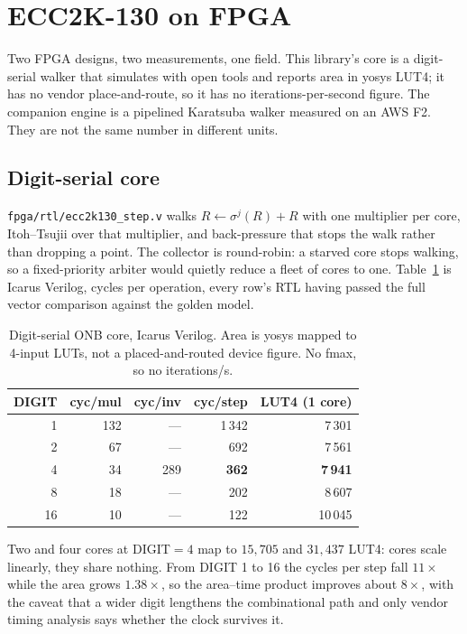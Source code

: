 \section{ECC2K-130 on FPGA}
\label{sec:ecc2k-fpga}

Two FPGA designs, two measurements, one field. This library's core is
a digit-serial walker that simulates with open tools and reports area
in yosys LUT4; it has no vendor place-and-route, so it has no
iterations-per-second figure. The companion engine is a pipelined
Karatsuba walker measured on an AWS F2. They are not the same number
in different units.

\subsection{Digit-serial core}
\label{sec:fpga-core}

\texttt{fpga/rtl/ecc2k130\_step.v} walks $R\leftarrow\sigma^j(R)+R$
with one multiplier per core, Itoh--Tsujii over that multiplier, and
back-pressure that stops the walk rather than dropping a point. The
collector is round-robin: a starved core stops walking, so a
fixed-priority arbiter would quietly reduce a fleet of cores to one.
Table~\ref{tab:fpga-cycles} is Icarus Verilog, cycles per operation,
every row's RTL having passed the full vector comparison against the
golden model.

\begin{table}[t]
\centering
\small
\caption{Digit-serial ONB core, Icarus Verilog. Area is yosys mapped
  to 4-input LUTs, not a placed-and-routed device figure. No fmax, so
  no iterations/s.}
\label{tab:fpga-cycles}
\begin{tabular}{@{}rrrrr@{}}
\toprule
DIGIT & cyc/mul & cyc/inv & cyc/step & LUT4 (1 core) \\
\midrule
1 & 132 & --- & 1\,342 & 7\,301 \\
2 & 67 & --- & 692 & 7\,561 \\
4 & 34 & 289 & \textbf{362} & \textbf{7\,941} \\
8 & 18 & --- & 202 & 8\,607 \\
16 & 10 & --- & 122 & 10\,045 \\
\bottomrule
\end{tabular}
\end{table}

Two and four cores at DIGIT${}=4$ map to $15{,}705$ and $31{,}437$
LUT4: cores scale linearly, they share nothing. From DIGIT 1 to 16
the cycles per step fall $11\times$ while the area grows $1.38\times$,
so the area--time product improves about $8\times$, with the caveat
that a wider digit lengthens the combinational path and only vendor
timing analysis says whether the clock survives it.

